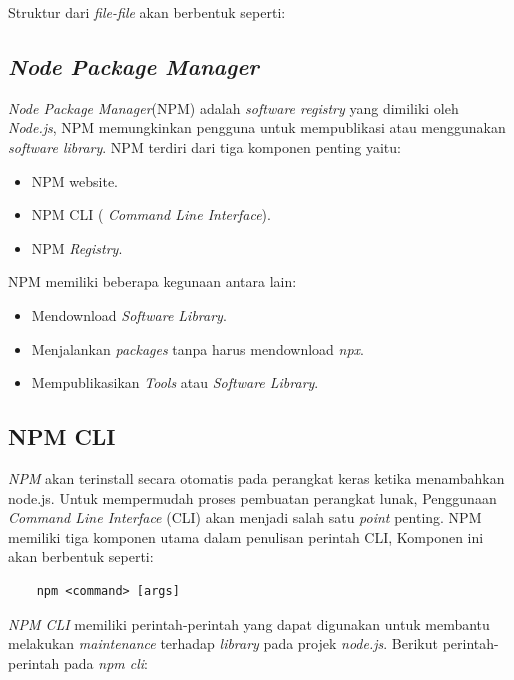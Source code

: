	Struktur dari \textit{file-file} akan berbentuk seperti:


\subsection{\textit{Node Package Manager}}
\textit{Node Package Manager}(NPM) adalah \textit{software registry} yang dimiliki oleh \textit{Node.js}, NPM memungkinkan pengguna untuk mempublikasi atau menggunakan \textit{software library}\cite{npmjs:01:about}. NPM terdiri dari tiga komponen penting yaitu:
\begin{itemize}
    \item NPM website.
    \item NPM CLI ( \textit{Command Line Interface}). 
    \item NPM \textit{Registry}.
\end{itemize}
NPM memiliki beberapa kegunaan antara lain:

\begin{itemize}
    \item Mendownload \textit{Software Library}.
    \item Menjalankan \textit{packages} tanpa harus mendownload \textit{npx}.
    \item Mempublikasikan \textit{Tools} atau \textit{Software Library}.
\end{itemize}

\subsection{NPM CLI}
\textit{NPM} akan terinstall secara otomatis pada perangkat keras ketika menambahkan node.js. Untuk mempermudah proses pembuatan perangkat lunak, Penggunaan \textit{Command Line Interface} (CLI) akan menjadi salah satu \textit{point} penting. NPM memiliki tiga komponen utama dalam penulisan perintah CLI, Komponen ini akan berbentuk seperti:
\begin{verbatim}
    npm <command> [args]
\end{verbatim}
\textit {NPM CLI} memiliki perintah-perintah yang dapat digunakan untuk membantu melakukan \textit{maintenance} terhadap \textit{library} pada projek \textit{node.js}. Berikut perintah-perintah pada \textit{npm cli}:


